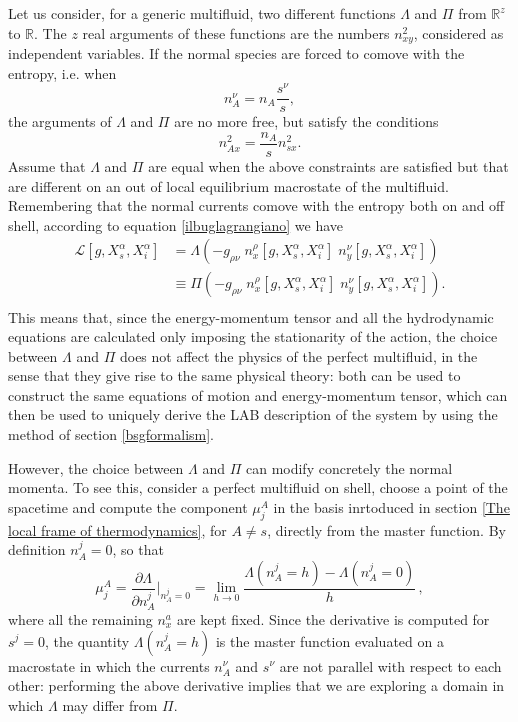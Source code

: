 \documentclass[usenatbib]{mnras}
\begin{document}
Let us consider, for a generic multifluid, two different functions $\Lambda$ and $\Pi$ from $\mathbb{R}^z$ to $\mathbb{R}$. The $z$ real arguments of these functions are the numbers $n_{xy}^2$, considered as independent variables. If the normal species are forced to comove with the entropy, i.e. when
%
\begin{equation}
n_A^\nu = n_A \dfrac{s^\nu}{s},
\end{equation}
%
the arguments of $\Lambda$ and $\Pi$ are no more free, but satisfy the conditions
%
\begin{equation}
n_{Ax}^2 = \dfrac{n_A}{s} n_{sx}^2 .
\end{equation}
%
Assume that $\Lambda$ and $\Pi$ are equal when the above constraints are satisfied but that are different on an out of local equilibrium macrostate of the multifluid. Remembering that the normal currents comove with the entropy both on and off shell, according to equation \eqref{ilbuglagrangiano} we have
%
\begin{equation}
\begin{split}
\mathcal{L}[ g  , X_s^\alpha  ,X^\alpha_{i} ]& =  \Lambda (-g_{\rho \nu} \; n_x^\rho[ g  , X_s^\alpha  ,X^\alpha_{i} ] \; n_y^\nu[ g  , X_s^\alpha  ,X^\alpha_{i} ] )  \\
& \equiv \Pi (-g_{\rho \nu} \; n_x^\rho[ g  , X_s^\alpha  ,X^\alpha_{i} ] \; n_y^\nu[ g  , X_s^\alpha  ,X^\alpha_{i} ] ). \\
\end{split}
\end{equation}
%
This means that, since the energy-momentum tensor and all the hydrodynamic equations are calculated only imposing the stationarity of the action, the choice between $\Lambda$ and $\Pi$ does not affect the physics of the perfect multifluid, in the sense that they give rise to the same physical theory: both can be used to construct the same equations of motion and energy-momentum tensor, which can then be used to uniquely derive the LAB description of the system by using the method of section \eqref{bsgformalism}.

However, the choice between $\Lambda$ and $\Pi$ can modify concretely the normal momenta. To see this, consider a perfect multifluid on shell, choose a point of the spacetime and compute the component $\mu_{ j}^A$ in the basis inrtoduced in section \ref{The local frame of thermodynamics}, for  $A \neq s$, directly from the master function. By definition $n_A^j=0$, so that
%
\begin{equation}
\mu_{ j}^A = \dfrac{\partial \Lambda}{\partial n_{A}^j} \bigg|_{n_A^j=0} 
= 
\lim_{h \rightarrow 0} \dfrac{\Lambda(n_{A}^j =h) -\Lambda(n_{A}^j=0 )}{h} \, ,
\end{equation}
%
where all the remaining $n_x^a$ are kept fixed. Since the derivative is computed for $s^j=0$, the quantity $\Lambda(n_{A}^j =h)$ is the master function evaluated on a macrostate in which the currents $n_{A}^\nu$ and $s^\nu$ are not parallel with respect to each other: performing the above derivative implies that we are exploring a domain in which $\Lambda$ may differ from $\Pi$. 
\end{document}
